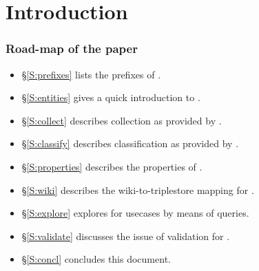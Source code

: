 
\section{Introduction}


\subsubsection*{Road-map of the paper}

\begin{itemize}
\item \S\ref{S:prefixes} lists the prefixes of \solasote.
\item \S\ref{S:entities} gives a quick introduction to \solasote.
\item \S\ref{S:collect} describes collection as provided by \solasote.
\item \S\ref{S:classify} describes classification as provided by \solasote.
\item \S\ref{S:properties} describes the properties of \solasote.
\item \S\ref{S:wiki} describes the wiki-to-triplestore mapping for \solasote.
\item \S\ref{S:explore} explores \solasote{} for usecases by means of queries.
\item \S\ref{S:validate} discusses the issue of validation for \solasote.
\item \S\ref{S:concl} concludes this document.
\end{itemize}

